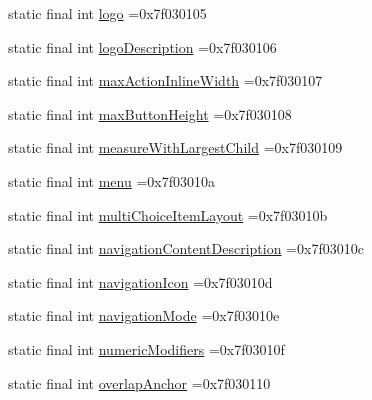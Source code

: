 \begin{DoxyCompactItemize}
\item 
static final int \mbox{\hyperlink{classbr_1_1unb_1_1cic_1_1mp_1_1marketmaster_1_1test_1_1R_1_1attr_ae403f2002c20c28ab8411ac515632523}{logo}} =0x7f030105
\item 
static final int \mbox{\hyperlink{classbr_1_1unb_1_1cic_1_1mp_1_1marketmaster_1_1test_1_1R_1_1attr_a4dc709dc72de52543d679f48f7900f88}{logo\+Description}} =0x7f030106
\item 
static final int \mbox{\hyperlink{classbr_1_1unb_1_1cic_1_1mp_1_1marketmaster_1_1test_1_1R_1_1attr_aaaae9b3b371e711e6212efda5569f34b}{max\+Action\+Inline\+Width}} =0x7f030107
\item 
static final int \mbox{\hyperlink{classbr_1_1unb_1_1cic_1_1mp_1_1marketmaster_1_1test_1_1R_1_1attr_af382a757b6058c9a134ab51a6490eb78}{max\+Button\+Height}} =0x7f030108
\item 
static final int \mbox{\hyperlink{classbr_1_1unb_1_1cic_1_1mp_1_1marketmaster_1_1test_1_1R_1_1attr_ac3f336035c2928b7242befdaf4c73262}{measure\+With\+Largest\+Child}} =0x7f030109
\item 
static final int \mbox{\hyperlink{classbr_1_1unb_1_1cic_1_1mp_1_1marketmaster_1_1test_1_1R_1_1attr_a7a341e83b576e409f23fe5b423a05075}{menu}} =0x7f03010a
\item 
static final int \mbox{\hyperlink{classbr_1_1unb_1_1cic_1_1mp_1_1marketmaster_1_1test_1_1R_1_1attr_a785069ce302473497dbc71127428ad28}{multi\+Choice\+Item\+Layout}} =0x7f03010b
\item 
static final int \mbox{\hyperlink{classbr_1_1unb_1_1cic_1_1mp_1_1marketmaster_1_1test_1_1R_1_1attr_ae460368476c9762257114ec0916eb6cf}{navigation\+Content\+Description}} =0x7f03010c
\item 
static final int \mbox{\hyperlink{classbr_1_1unb_1_1cic_1_1mp_1_1marketmaster_1_1test_1_1R_1_1attr_a6b46e4442d10fb17ec8ba753cd8f32ec}{navigation\+Icon}} =0x7f03010d
\item 
static final int \mbox{\hyperlink{classbr_1_1unb_1_1cic_1_1mp_1_1marketmaster_1_1test_1_1R_1_1attr_a9c5742dded1ef1126c90d2dd9712cd41}{navigation\+Mode}} =0x7f03010e
\item 
static final int \mbox{\hyperlink{classbr_1_1unb_1_1cic_1_1mp_1_1marketmaster_1_1test_1_1R_1_1attr_a6c11ac0346cc237934cb1c5d837f7887}{numeric\+Modifiers}} =0x7f03010f
\item 
static final int \mbox{\hyperlink{classbr_1_1unb_1_1cic_1_1mp_1_1marketmaster_1_1test_1_1R_1_1attr_ac0f58a5bb2f4a18631d3b22633bf416c}{overlap\+Anchor}} =0x7f030110
\item 

\end{DoxyCompactItemize}
